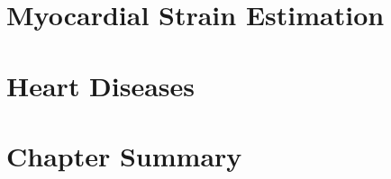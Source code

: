 \section{Myocardial Strain Estimation}
\begin{comment}
[ ] Method for extracting strain curves from ultrasound videos.
\end{comment}

\section{Heart Diseases}
\begin{comment}
[ ] Explain the different diagnosises that will be encountered in this thesis.
[ ] Explain anatomical reasoning for why symptoms for certain diagnosis are evident in strain curves.
\end{comment}

\section{Chapter Summary}
